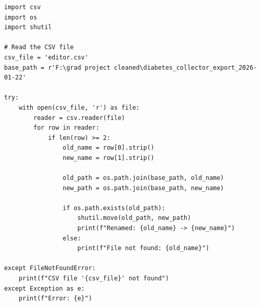 \begin{listing}[h!]
\begin{verbatim}
import csv
import os
import shutil

# Read the CSV file
csv_file = 'editor.csv'
base_path = r'F:\grad project cleaned\diabetes_collector_export_2026-01-22'

try:
    with open(csv_file, 'r') as file:
        reader = csv.reader(file)
        for row in reader:
            if len(row) >= 2:
                old_name = row[0].strip()
                new_name = row[1].strip()
                
                old_path = os.path.join(base_path, old_name)
                new_path = os.path.join(base_path, new_name)
                
                if os.path.exists(old_path):
                    shutil.move(old_path, new_path)
                    print(f"Renamed: {old_name} -> {new_name}")
                else:
                    print(f"File not found: {old_name}")
                    
except FileNotFoundError:
    print(f"CSV file '{csv_file}' not found")
except Exception as e:
    print(f"Error: {e}")
\end{verbatim}
\caption{Python Script for Automated Dataset Hierarchy Restructuring}
\label{lst:restructure_script}
\end{listing}
